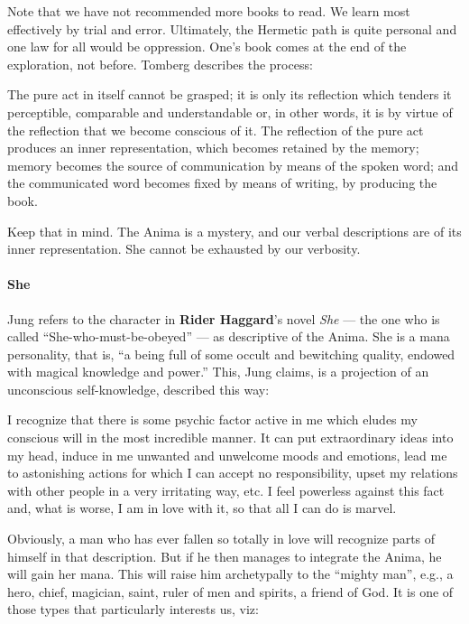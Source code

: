 Note that we have not recommended more books to read. We learn most effectively by trial and error. Ultimately, the Hermetic path is quite personal and one law for all would be oppression. One's book comes at the end of the exploration, not before. Tomberg describes the process:

\begin{quotex}
The pure act in itself cannot be grasped; it is only its reflection which tenders it perceptible, comparable and understandable or, in other words, it is by virtue of the reflection that we become conscious of it. The reflection of the pure act produces an inner representation, which becomes retained by the memory; memory becomes the source of communication by means of the spoken word; and the communicated word becomes fixed by means of writing, by producing the book. 

\end{quotex}
Keep that in mind. The Anima is a mystery, and our verbal descriptions are of its inner representation. She cannot be exhausted by our verbosity.

\paragraph{She}
Jung refers to the character in \textbf{Rider Haggard}'s novel \emph{She} — the one who is called “She-who-must-be-obeyed” — as descriptive of the Anima. She is a mana personality, that is, “a being full of some occult and bewitching quality, endowed with magical knowledge and power.” This, Jung claims, is a projection of an unconscious self-knowledge, described this way:

\begin{quotex}
I recognize that there is some psychic factor active in me which eludes my conscious will in the most incredible manner. It can put extraordinary ideas into my head, induce in me unwanted and unwelcome moods and emotions, lead me to astonishing actions for which I can accept no responsibility, upset my relations with other people in a very irritating way, etc. I feel powerless against this fact and, what is worse, I am in love with it, so that all I can do is marvel. 

\end{quotex}
Obviously, a man who has ever fallen so totally in love will recognize parts of himself in that description. But if he then manages to integrate the Anima, he will gain her mana. This will raise him archetypally to the “mighty man”, e.g., a hero, chief, magician, saint, ruler of men and spirits, a friend of God. It is one of those types that particularly interests us, viz:

